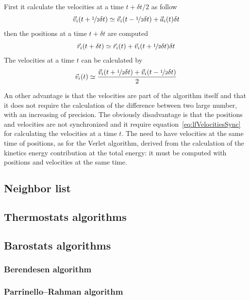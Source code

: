 First it calculate the velocities at a time $t+\delta t/2$ as follow
\begin{equation*}
	\vec v_i(t + \nicefrac{1}{2}\delta t) \simeq \vec v_i(t - \nicefrac{1}{2}\delta t) + \vec a_i(t)\delta t
\end{equation*}
then the positions at a time $t+\delta t$ are computed
\begin{equation*}
	\vec r_i(t + \delta t) \simeq \vec r_i(t) + \vec v_i(t + \nicefrac{1}{2}\delta t)\delta t
\end{equation*}
The velocities at a time $t$ can be calculated by
\begin{equation}
	\vec v_i(t) \simeq \frac{\vec v_i(t + \nicefrac{1}{2}\delta t) + \vec v_i(t - \nicefrac{1}{2}\delta t)}{2}
	\label{eq:lfVelocitiesSync}
\end{equation}

An other advantage is that the velocities are part of the algorithm itself and that it does not require the calculation of the difference between two large number, with an increasing of precision. The obviously disadvantage is that the positions and velocities are not synchronized and it require equation~\eqref{eq:lfVelocitiesSync} for calculating the velocities at a time $t$. The need to have velocities at the same time of positions, as for the Verlet algorithm, derived from the calculation of the kinetics energy contribution at the total energy: it must be computed with positions and velocities at the same time.

\subsection{Neighbor list}

	\subsection{Thermostats algorithms} %
	\subsection{Barostats algorithms} %
		\subsubsection{Berendesen algorithm}

		\subsubsection{Parrinello--Rahman algorithm}

